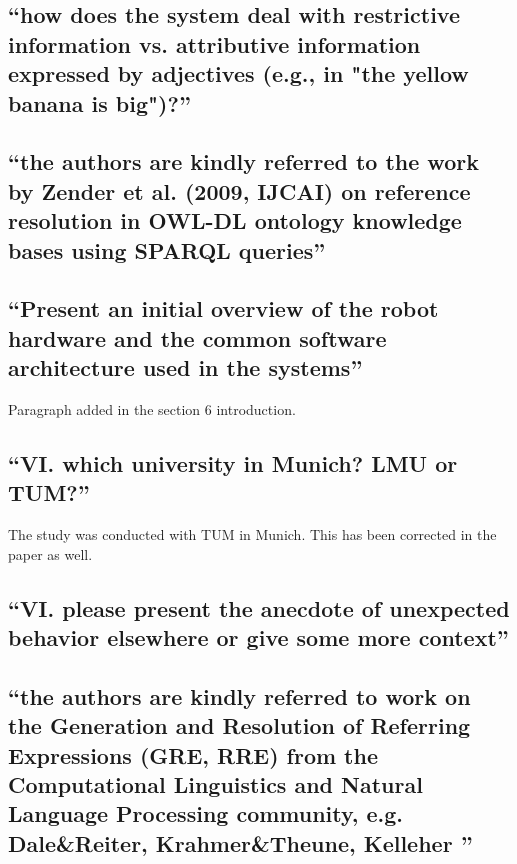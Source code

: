 \documentclass{article}
\begin{document}
\subsection{``how does the system deal with restrictive information vs.
attributive information expressed by adjectives (e.g., in "the yellow banana is
big")?''}

\subsection{``the authors are kindly referred to the work by Zender et al.
(2009, IJCAI) on reference resolution in OWL-DL ontology knowledge bases using
SPARQL queries''}

\subsection{``Present an initial overview of the
robot hardware and the common software architecture used in the systems''}

Paragraph added in the section 6 introduction.

\subsection{``VI. which university in Munich? LMU or TUM?''}

The study was conducted with TUM in Munich. This has been corrected in 
the paper as well.

\subsection{``VI. please present the anecdote of unexpected behavior elsewhere
or give some more context''}

\subsection{``the authors are kindly referred to work on the Generation and
Resolution of Referring Expressions (GRE, RRE) from the Computational
Linguistics and Natural Language Processing community, e.g. Dale\&Reiter,
Krahmer\&Theune, Kelleher ''}
\end{document}

